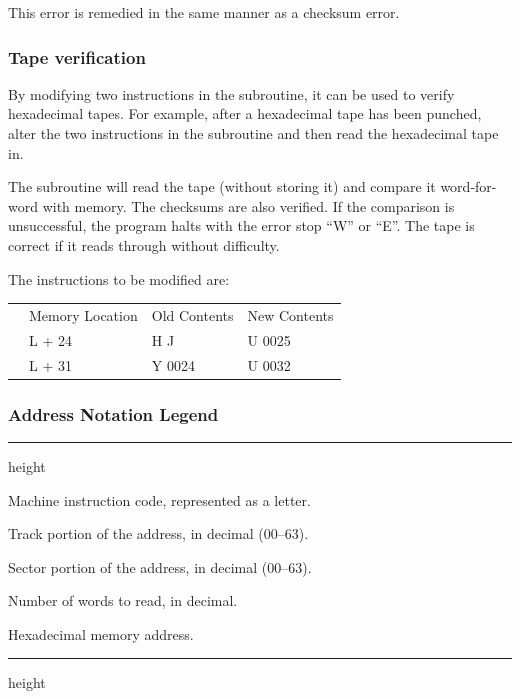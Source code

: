 \documentclass{article}
\begin{document}
\begin{enumerate}
This error is remedied in the same manner as a checksum error.

\subsubsection*{Tape verification}
By modifying two instructions in the subroutine, it can be used to verify hexadecimal tapes. For example, after a hexadecimal tape has been punched, alter the two instructions in the subroutine and then read the hexadecimal tape in.

The subroutine will read the tape (without storing it) and compare it word-for-word with memory. The checksums are also verified. If the comparison is unsuccessful, the program halts with the error stop ``W'' or ``E''. The tape is correct if it reads through without difficulty.

The instructions to be modified are:

\begin{tabular}{llll}
 & Memory Location  &  Old Contents &   New Contents \\
 & L + 24     &        H J      &       U 0025 \\
 & L + 31     &        Y 0024   &       U 0032
\end{tabular}

\subsubsection*{Address Notation Legend}

\noindent
\hrule height \heavyrulewidth
\nopagebreak
\begin{description}[leftmargin=2.0em, itemsep=3pt, topsep=4pt, parsep=0pt, partopsep=0pt]
    \item[\texttt{Ø}] Machine instruction code, represented as a letter.
    \item[\texttt{TT}] Track portion of the address, in decimal (00--63).
    \item[\texttt{SS}] Sector portion of the address, in decimal (00--63).
    \item[\texttt{NN}] Number of words to read, in decimal.
    \item[\texttt{HHHH}] Hexadecimal memory address.
\end{description}
\nopagebreak
\hrule height \heavyrulewidth


\end{enumerate}
\end{document}
